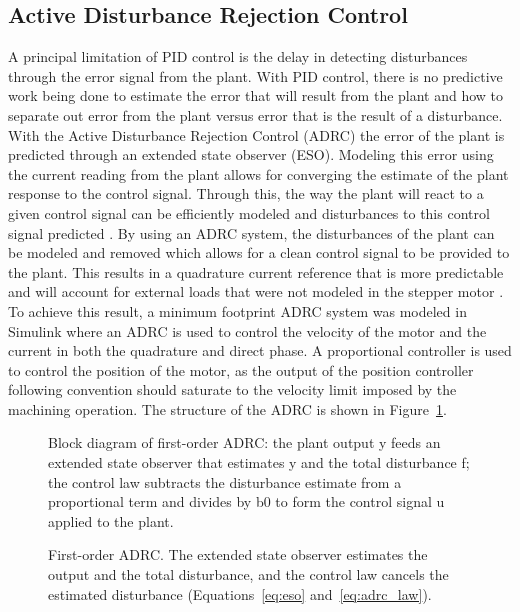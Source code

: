 \subsection{Active Disturbance Rejection Control}\label{ADRCOverview}
A principal limitation of PID control is the delay in detecting disturbances through the error signal from the plant. With PID control, there is no predictive work being done to estimate the error that will result from the plant and how to separate out error from the plant versus error that is the result of a disturbance. With the Active Disturbance Rejection Control (ADRC) the error of the plant is predicted through an extended state observer (ESO). Modeling this error using the current reading from the plant allows for converging the estimate of the plant response to the control signal. Through this, the way the plant will react to a given control signal can be efficiently modeled and disturbances to this control signal predicted \cite{herbst_tuning_2023}. 
By using an ADRC system, the disturbances of the plant can be modeled and removed which allows for a clean control signal to be provided to the plant. This results in a quadrature current reference that is more predictable and will account for external loads that were not modeled in the stepper motor \cite{herbst_tuning_2023}. To achieve this result, a minimum footprint ADRC system was modeled in Simulink where an ADRC is used to control the velocity of the motor and the current in both the quadrature and direct phase. A proportional controller is used to control the position of the motor, as the output of the position controller following convention should saturate to the velocity limit imposed by the machining operation. The structure of the ADRC is shown in Figure~\ref{fig:adrc_block}. 

\begin{figure}[htbp]
	\centering
		{Block diagram of first-order ADRC: the plant output y feeds an extended state observer that estimates y and the total disturbance f; the control law subtracts the disturbance estimate from a proportional term and divides by b0 to form the control signal u applied to the plant.}
	\caption[First-order ADRC structure]{First-order ADRC. The extended state observer estimates the output and the total disturbance, and the control law cancels the estimated disturbance (Equations~\eqref{eq:eso} and~\eqref{eq:adrc_law}).}
	\label{fig:adrc_block}
\end{figure}


